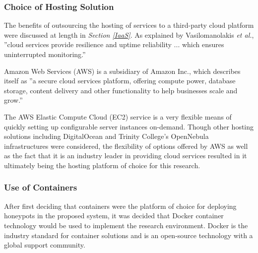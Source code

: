 \subsubsection{Choice of Hosting Solution}
The benefits of outsourcing the hosting of services to a third-party cloud platform were discussed at length in {\textit{Section \ref{IaaS}}.} As explained by Vasilomanolakis \textit{et al.}, ''cloud services provide resilience and uptime reliability ... which ensures uninterrupted monitoring.'' \cite{Vasilomanolakis}

Amazon Web Services (AWS) is a subsidiary of Amazon Inc., which describes itself as ''a secure cloud services platform, offering compute power, database storage, content delivery and other functionality to help businesses scale and grow.'' \cite{WhatIsAWS}
        
The AWS Elastic Compute Cloud (EC2) service is a very flexible means of quickly setting up configurable server instances on-demand. Though other hosting solutions including DigitalOcean and Trinity College's OpenNebula infrastructures were considered, the flexibility of options offered by AWS as well as the fact that it is an industry leader in providing cloud services resulted in it ultimately being the hosting platform of choice for this research.

\subsubsection{Use of Containers}

After first deciding that containers were the platform of choice for deploying honeypots in the proposed system, it was decided that Docker container technology would be used to implement the research environment. Docker is the industry standard for container solutions and is an open-source technology with a global support community.

